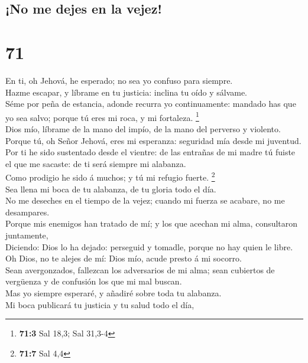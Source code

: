 \hypertarget{no-me-dejes-en-la-vejez}{%
\subsection{¡No me dejes en la vejez!}\label{no-me-dejes-en-la-vejez}}

\hypertarget{section-70}{%
\section{71}\label{section-70}}

 En ti, oh Jehová, he esperado; no sea yo confuso para
siempre.\\
 Hazme escapar, y líbrame en tu justicia: inclina tu oído y
sálvame.\\
 Séme por peña de estancia, adonde recurra yo continuamente:
mandado has que yo sea salvo; porque tú eres mi roca, y mi fortaleza.
\footnote{\textbf{71:3} Sal 18,3; Sal 31,3-4}\\
 Dios mío, líbrame de la mano del impío, de la mano del
perverso y violento.\\
 Porque tú, oh Señor Jehová, eres mi esperanza: seguridad
mía desde mi juventud.\\
 Por ti he sido sustentado desde el vientre: de las entrañas
de mi madre tú fuiste el que me sacaste: de ti será siempre mi
alabanza.\\
 Como prodigio he sido á muchos; y tú mi refugio fuerte.
\footnote{\textbf{71:7} Sal 4,4}\\
 Sea llena mi boca de tu alabanza, de tu gloria todo el
día.\\
 No me deseches en el tiempo de la vejez; cuando mi fuerza
se acabare, no me desampares.\\
 Porque mis enemigos han tratado de mí; y los que acechan
mi alma, consultaron juntamente,\\
 Diciendo: Dios lo ha dejado: perseguid y tomadle, porque
no hay quien le libre.\\
 Oh Dios, no te alejes de mí: Dios mío, acude presto á mi
socorro.\\
 Sean avergonzados, fallezcan los adversarios de mi alma;
sean cubiertos de vergüenza y de confusión los que mi mal buscan.\\
 Mas yo siempre esperaré, y añadiré sobre toda tu
alabanza.\\
 Mi boca publicará tu justicia y tu salud todo el día,
